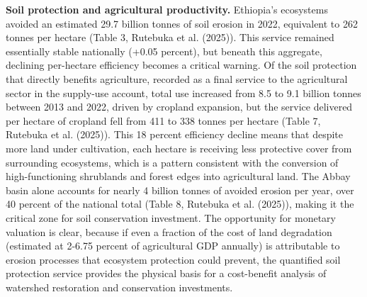 \documentclass[
  letterpaper,
  DIV=11,
  numbers=noendperiod]{scrartcl}
\begin{document}
\textbf{Soil protection and agricultural productivity.} Ethiopia's
ecosystems avoided an estimated 29.7 billion tonnes of soil erosion in
2022, equivalent to 262 tonnes per hectare (Table 3, Rutebuka et al.
(2025)). This service remained essentially stable nationally (+0.05
percent), but beneath this aggregate, declining per-hectare efficiency
becomes a critical warning. Of the soil protection that directly
benefits agriculture, recorded as a final service to the agricultural
sector in the supply-use account, total use increased from 8.5 to 9.1
billion tonnes between 2013 and 2022, driven by cropland expansion, but
the service delivered per hectare of cropland fell from 411 to 338
tonnes per hectare (Table 7, Rutebuka et al. (2025)). This 18 percent
efficiency decline means that despite more land under cultivation, each
hectare is receiving less protective cover from surrounding ecosystems,
which is a pattern consistent with the conversion of high-functioning
shrublands and forest edges into agricultural land. The Abbay basin
alone accounts for nearly 4 billion tonnes of avoided erosion per year,
over 40 percent of the national total (Table 8, Rutebuka et al. (2025)),
making it the critical zone for soil conservation investment. The
opportunity for monetary valuation is clear, because if even a fraction
of the cost of land degradation (estimated at 2-6.75 percent of
agricultural GDP annually) is attributable to erosion processes that
ecosystem protection could prevent, the quantified soil protection
service provides the physical basis for a cost-benefit analysis of
watershed restoration and conservation investments.
\end{document}

